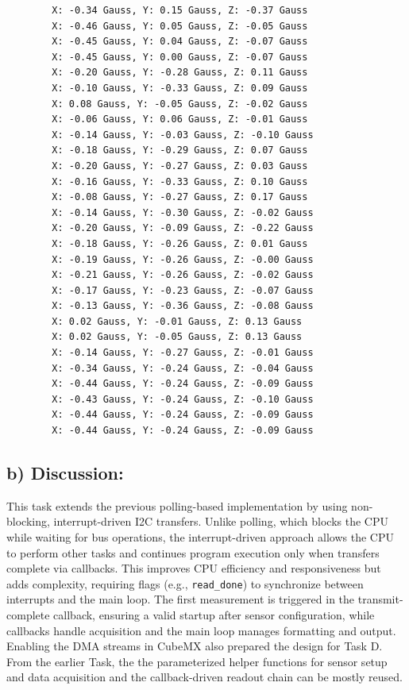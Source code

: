 \begin{table}[H]
    \caption{Magnetic field measurements (Gauss) from the LIS3MDL sensor.}
	\label{tab:result_gauss}
	\begin{center}
		\begin{verbatim}
		X: -0.34 Gauss, Y: 0.15 Gauss, Z: -0.37 Gauss  
		X: -0.46 Gauss, Y: 0.05 Gauss, Z: -0.05 Gauss  
		X: -0.45 Gauss, Y: 0.04 Gauss, Z: -0.07 Gauss  
		X: -0.45 Gauss, Y: 0.00 Gauss, Z: -0.07 Gauss  
		X: -0.20 Gauss, Y: -0.28 Gauss, Z: 0.11 Gauss  
		X: -0.10 Gauss, Y: -0.33 Gauss, Z: 0.09 Gauss  
		X: 0.08 Gauss, Y: -0.05 Gauss, Z: -0.02 Gauss  
		X: -0.06 Gauss, Y: 0.06 Gauss, Z: -0.01 Gauss  
		X: -0.14 Gauss, Y: -0.03 Gauss, Z: -0.10 Gauss  
		X: -0.18 Gauss, Y: -0.29 Gauss, Z: 0.07 Gauss  
		X: -0.20 Gauss, Y: -0.27 Gauss, Z: 0.03 Gauss  
		X: -0.16 Gauss, Y: -0.33 Gauss, Z: 0.10 Gauss  
		X: -0.08 Gauss, Y: -0.27 Gauss, Z: 0.17 Gauss  
		X: -0.14 Gauss, Y: -0.30 Gauss, Z: -0.02 Gauss  
		X: -0.20 Gauss, Y: -0.09 Gauss, Z: -0.22 Gauss  
		X: -0.18 Gauss, Y: -0.26 Gauss, Z: 0.01 Gauss  
		X: -0.19 Gauss, Y: -0.26 Gauss, Z: -0.00 Gauss  
		X: -0.21 Gauss, Y: -0.26 Gauss, Z: -0.02 Gauss  
		X: -0.17 Gauss, Y: -0.23 Gauss, Z: -0.07 Gauss  
		X: -0.13 Gauss, Y: -0.36 Gauss, Z: -0.08 Gauss  
		X: 0.02 Gauss, Y: -0.01 Gauss, Z: 0.13 Gauss  
		X: 0.02 Gauss, Y: -0.05 Gauss, Z: 0.13 Gauss  
		X: -0.14 Gauss, Y: -0.27 Gauss, Z: -0.01 Gauss  
		X: -0.34 Gauss, Y: -0.24 Gauss, Z: -0.04 Gauss  
		X: -0.44 Gauss, Y: -0.24 Gauss, Z: -0.09 Gauss  
		X: -0.43 Gauss, Y: -0.24 Gauss, Z: -0.10 Gauss  
		X: -0.44 Gauss, Y: -0.24 Gauss, Z: -0.09 Gauss  
		X: -0.44 Gauss, Y: -0.24 Gauss, Z: -0.09 Gauss  
		\end{verbatim}
	\end{center}
\end{table}

\subsection{b) Discussion:}
This task extends the previous polling-based implementation by using non-blocking, interrupt-driven I2C transfers. Unlike polling, which blocks the CPU while waiting for bus operations, the interrupt-driven approach allows the CPU to perform other tasks and continues program execution only when transfers complete via callbacks. This improves CPU efficiency and responsiveness but adds complexity, requiring flags (e.g., \texttt{read\_done}) to synchronize between interrupts and the main loop. 
The first measurement is triggered in the transmit-complete callback, ensuring a valid startup after sensor configuration, while callbacks handle acquisition and the main loop manages formatting and output. Enabling the DMA streams in CubeMX also prepared the design for Task D. 
From the earlier Task, the the parameterized helper functions for sensor setup and data acquisition and the callback-driven readout chain can be mostly reused.